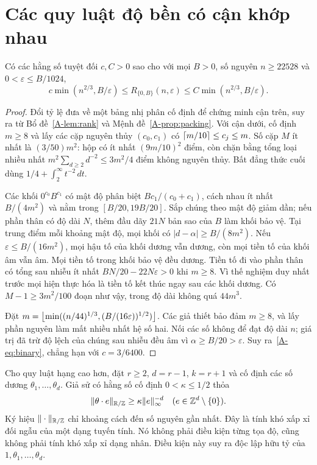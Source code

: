 \section{Các quy luật độ bền có cận khớp nhau}
\begin{theorem}\label{A-thm:binary}
Có các hằng số tuyệt đối $c,C>0$ sao cho với mọi $B>0$, số nguyên $n\ge22528$ và $0<\varepsilon\le B/1024$,
\begin{equation}\label{A-eq:binary}
c\min(n^{2/3},B/\varepsilon)\le R_{\{0,B\}}(n,\varepsilon)
\le C\min(n^{2/3},B/\varepsilon).
\end{equation}
\end{theorem}
\begin{proof}
Đổi tỷ lệ đưa về một bảng nhị phân cố định để chứng minh cận trên, suy ra từ Bổ đề~\ref{A-lem:rank} và Mệnh đề~\ref{A-prop:packing}. Với cận dưới, cố định $m\ge8$ và lấy các cặp nguyên thủy $(c_0,c_1)$ có $\left\lceil m/10\right\rceil\le c_j\le m$. Số cặp $M$ ít nhất là $(3/50)m^2$: hộp có ít nhất $(9m/10)^2$ điểm, còn chặn bằng tổng loại nhiều nhất $m^2\sum_{d\ge2}d^{-2}\le3m^2/4$ điểm không nguyên thủy. Bất đẳng thức cuối dùng $1/4+\int_2^\infty t^{-2}\,dt$.

Các khối $0^{c_0}B^{c_1}$ có mật độ phân biệt $Bc_1/(c_0+c_1)$, cách nhau ít nhất $B/(4m^2)$ và nằm trong $[B/20,19B/20]$. Sắp chúng theo mật độ giảm dần; nếu phần thân có độ dài $N$, thêm đầu dãy $21N$ bản sao của $B$ làm khối bảo vệ. Tại trung điểm mỗi khoảng mật độ, mọi khối có $|d-\alpha|\ge B/(8m^2)$. Nếu $\varepsilon\le B/(16m^2)$, mọi hậu tố của khối dương vẫn dương, còn mọi tiền tố của khối âm vẫn âm. Mọi tiền tố trong khối bảo vệ đều dương. Tiền tố đi vào phần thân có tổng sau nhiễu ít nhất $BN/20-22N\varepsilon>0$ khi $m\ge8$. Vì thế nghiệm duy nhất trước mọi hiện thực hóa là tiền tố kết thúc ngay sau các khối dương. Có $M-1\ge3m^2/100$ đoạn như vậy, trong độ dài không quá $44m^3$.

Đặt $m=\left\lfloor \min((n/44)^{1/3},(B/(16\varepsilon))^{1/2})\right\rfloor$. Các giả thiết bảo đảm $m\ge8$, và lấy phần nguyên làm mất nhiều nhất hệ số hai. Nối các số không để đạt độ dài $n$; giá trị đã trừ độ lệch của chúng sau nhiễu đều âm vì $\alpha\ge B/20>\varepsilon$. Suy ra~\eqref{A-eq:binary}, chẳng hạn với $c=3/6400$.
\end{proof}

Cho quy luật hạng cao hơn, đặt $r\ge2$, $d=r-1$, $k=r+1$ và cố định các số dương $\theta_1,\ldots,\theta_d$. Giả sử có hằng số cố định $0<\kappa\le1/2$ thỏa
\begin{equation}\label{A-eq:BA}
\|\theta\cdot e\|_{\mathbb R/\mathbb Z}\ge\kappa\|e\|_\infty^{-d}
\quad(e\in\mathbb Z^d\setminus\{0\}).
\end{equation}
Ký hiệu $\|\cdot\|_{\mathbb R/\mathbb Z}$ chỉ khoảng cách đến số nguyên gần nhất. Đây là tính khó xấp xỉ đối ngẫu của một dạng tuyến tính. Nó không phải điều kiện từng tọa độ, cũng không phải tính khó xấp xỉ dạng nhân. Điều kiện này suy ra độc lập hữu tỷ của $1,\theta_1,\ldots,\theta_d$.

